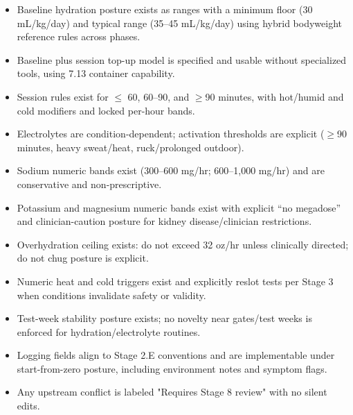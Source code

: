 \documentclass[10pt]{article}
\begin{document}
\begin{itemize}
\item Baseline hydration posture exists as ranges with a minimum floor (30 mL/kg/day) and typical range (35–45 mL/kg/day) using hybrid bodyweight reference rules across phases.
\item Baseline plus session top-up model is specified and usable without specialized tools, using 7.13 container capability.
\item Session rules exist for $\leq$ 60, 60–90, and $\geq$90 minutes, with hot/humid and cold modifiers and locked per-hour bands.
\item Electrolytes are condition-dependent; activation thresholds are explicit ($\geq$90 minutes, heavy sweat/heat, ruck/prolonged outdoor).
\item Sodium numeric bands exist (300–600 mg/hr; 600–1,000 mg/hr) and are conservative and non-prescriptive.
\item Potassium and magnesium numeric bands exist with explicit “no megadose” and clinician-caution posture for kidney disease/clinician restrictions.
\item Overhydration ceiling exists: do not exceed 32 oz/hr unless clinically directed; do not chug posture is explicit.
\item Numeric heat and cold triggers exist and explicitly reslot tests per Stage 3 when conditions invalidate safety or validity.
\item Test-week stability posture exists; no novelty near gates/test weeks is enforced for hydration/electrolyte routines.
\item Logging fields align to Stage 2.E conventions and are implementable under start-from-zero posture, including environment notes and symptom flags.
\item Any upstream conflict is labeled "Requires Stage 8 review" with no silent edits.
\end{itemize}
\end{document}
